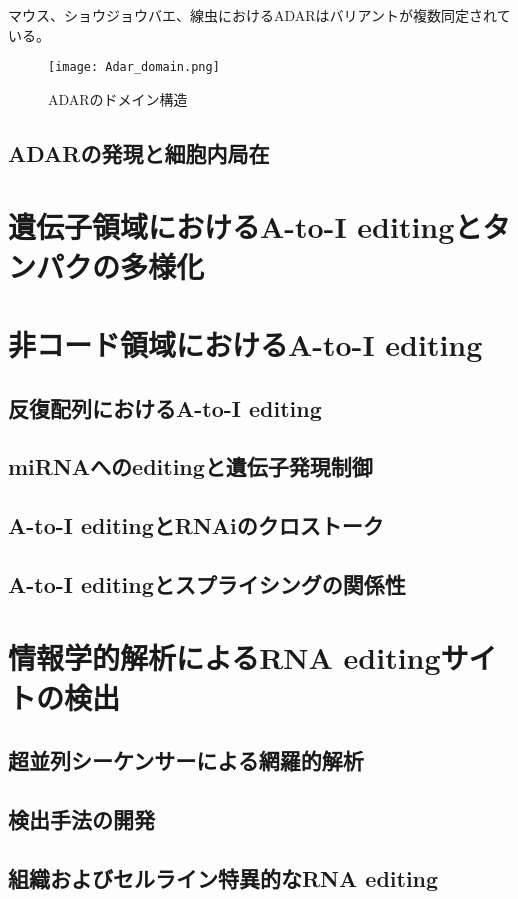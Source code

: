 マウス、ショウジョウバエ、線虫におけるADARはバリアントが複数同定されている。

\begin{figure}[htbp]
	\begin{center}
		\texttt{[image: Adar\_domain.png]}
	\end{center}
	\caption{ADARのドメイン構造}
\end{figure}

\subsection{ADARの発現と細胞内局在}

\section{遺伝子領域におけるA-to-I editingとタンパクの多様化}

\section{非コード領域におけるA-to-I editing}
\subsection{反復配列におけるA-to-I editing}

\subsection{miRNAへのeditingと遺伝子発現制御}
\subsection{A-to-I editingとRNAiのクロストーク}
\subsection{A-to-I editingとスプライシングの関係性}

\section{情報学的解析によるRNA editingサイトの検出}
\subsection{超並列シーケンサーによる網羅的解析}
\subsection{検出手法の開発}
\subsection{組織およびセルライン特異的なRNA editing}

